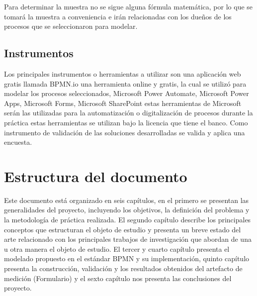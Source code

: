 Para determinar la muestra no se sigue alguna fórmula matemática, por lo que se tomará la muestra a conveniencia e irán relacionadas con los dueños de los procesos que se seleccionaron para modelar.

\subsection{Instrumentos}
Los principales instrumentos o herramientas a utilizar son una aplicación web gratis llamada BPMN.io una herramienta online y gratis, la cual se utilizó para modelar los procesos seleccionados, Microsoft Power Automate, Microsoft Power Apps, Microsoft Forms, Microsoft SharePoint estas herramientas de Microsoft serán las utilizadas para la automatización o digitalización de procesos durante la práctica estas herramientas se utilizan bajo la licencia que tiene el banco. Como instrumento de validación de las soluciones desarrolladas se valida y aplica una encuesta.




\section{Estructura del documento}

Este documento está organizado en seis capítulos, en el primero se presentan las generalidades del proyecto, incluyendo los objetivos, la definición del problema y la metodología de práctica realizada.
El segundo capítulo describe los principales conceptos que estructuran el objeto de estudio y presenta un breve estado del arte relacionado con los principales trabajos de investigación que abordan de una u otra manera el objeto de estudio.
El tercer y cuarto capítulo presenta el modelado propuesto en el estándar BPMN y su implementación, quinto capítulo presenta la construcción, validación y los resultados obtenidos del artefacto de medición (Formulario) y el sexto capítulo nos presenta las conclusiones del proyecto.